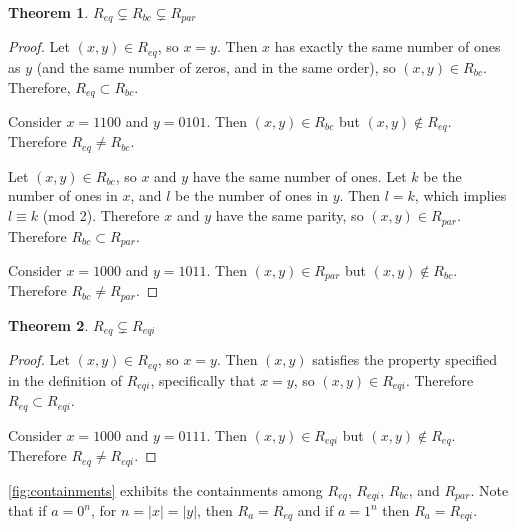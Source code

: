 \documentclass{article}
\newtheorem{theorem}{Theorem}%
\theoremstyle{definition}
\begin{document}
\begin{theorem}$R_{eq} \subsetneq R_{bc} \subsetneq R_{par}$\end{theorem}
\begin{proof}
  Let $(x, y)\in R_{eq}$, so $x=y$. Then $x$ has exactly the same number of ones
  as $y$ (and the same number of zeros, and in the same order), so $(x, y) \in
  R_{bc}$. Therefore, $R_{eq} \subset R_{bc}$.
 
  Consider $x=1100$ and $y=0101$. Then $(x, y)\in R_{bc}$ but $(x, y) \notin
  R_{eq}$. Therefore $R_{eq} \neq R_{bc}$.

  Let $(x, y)\in R_{bc}$, so $x$ and $y$ have the same number of ones. Let $k$
  be the number of ones in $x$, and $l$ be the number of ones in $y$. Then
  $l=k$, which implies $l \equiv k$ (mod 2). Therefore $x$ and $y$ have
  the same parity, so $(x, y)\in R_{par}$. Therefore $R_{bc} \subset R_{par}$.

  Consider $x=1000$ and $y=1011$. Then $(x, y)\in R_{par}$ but $(x, y) \notin
  R_{bc}$. Therefore $R_{bc} \neq R_{par}$.
\end{proof}

\begin{theorem}$R_{eq} \subsetneq R_{eqi}$\end{theorem}
\begin{proof}
  Let $(x, y)\in R_{eq}$, so $x=y$. Then $(x, y)$ satisfies the property
  specified in the definition of $R_{eqi}$, specifically that $x=y$, so
  $(x, y) \in R_{eqi}$. Therefore $R_{eq} \subset R_{eqi}$.

  Consider $x=1000$ and $y=0111$. Then $(x, y)\in R_{eqi}$ but $(x, y) \notin
  R_{eq}$. Therefore $R_{eq} \neq R_{eqi}$.
\end{proof}

\autoref{fig:containments} exhibits the containments among $R_{eq}$, $R_{eqi}$,
$R_{bc}$, and $R_{par}$. Note that if $a=0^n$, for $n=|x|=|y|$, then
$R_{a}=R_{eq}$ and if $a=1^n$ then $R_{a}=R_{eqi}$.
\end{document}
